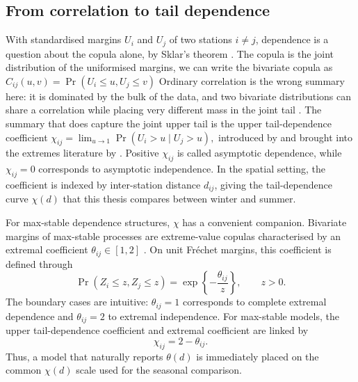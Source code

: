 \subsection{From correlation to tail dependence}\label{sec:lit-dependence}

With standardised margins \(U_i\) and \(U_j\) of two stations \(i\neq j\), dependence is a question about the copula alone, by Sklar's theorem \citep{sklar1959}. The copula is the joint distribution of the uniformised margins, we can write the bivariate copula as
\(
C_{ij}(u,v)
=
\Pr(U_i\leq u, U_j\leq v)
\)
Ordinary correlation is the wrong summary here: it is dominated by the bulk of the data, and two bivariate distributions can share a correlation while placing very different mass in the joint tail \citep{embrechts2002}. The summary that does capture the joint upper tail is the upper tail-dependence coefficient
\(
\chi_{ij}
=
\lim_{u\to1}
\Pr(U_i>u\mid U_j>u),
\)
introduced by \citet{sibuya1960} and brought into the extremes literature by \citet{coles1999}. Positive \(\chi_{ij}\) is called asymptotic dependence, while \(\chi_{ij}=0\) corresponds to asymptotic independence. In the spatial setting, the coefficient is indexed by inter-station distance \(d_{ij}\), giving the tail-dependence curve \(\chi(d)\) that this thesis compares between winter and summer.

For max-stable dependence structures, \(\chi\) has a convenient companion. Bivariate margins of max-stable processes are extreme-value copulas characterised by an extremal coefficient \(\theta_{ij}\in[1,2]\) \citep{schlather2003,gudendorf2010}. On unit Fr\'echet margins, this coefficient is defined through
\[
    \Pr(Z_i\leq z, Z_j\leq z)
    =
    \exp\left\{-\frac{\theta_{ij}}{z}\right\},
    \qquad z>0.
\]
The boundary cases are intuitive: \(\theta_{ij}=1\) corresponds to complete extremal dependence and \(\theta_{ij}=2\) to extremal independence. For max-stable models, the upper tail-dependence coefficient and extremal coefficient are linked by
\[
    \chi_{ij}
    =
    2-\theta_{ij}.
\]
Thus, a model that naturally reports \(\theta(d)\) is immediately placed on the common \(\chi(d)\) scale used for the seasonal comparison.


